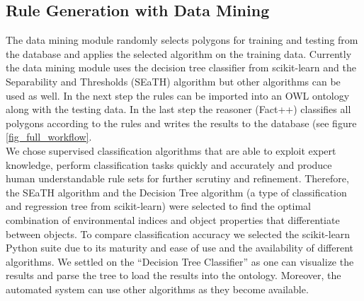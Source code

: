 \documentclass[authoryear, review,12pt,number]{elsarticle}
\begin{document}

\subsection{Rule Generation with Data Mining} The data mining module randomly
selects polygons for training and testing from the database and applies the
selected algorithm on the training data. 
Currently the data mining module uses the decision tree classifier from
scikit-learn \citep{scikit-learn} and the Separability and Thresholds (SEaTH)
algorithm \citep{Nussbaum2006} but other algorithms can be used as well. In the
next step the rules can be imported into an OWL ontology along with the testing
data. In the last step the reasoner (Fact++) classifies all polygons according
to the rules and writes the results to the database (see figure
\ref{fig_full_workflow}.\\ We chose supervised classification algorithms that
are able to exploit expert knowledge, perform classification tasks quickly and
accurately and produce human understandable rule sets for further scrutiny and
refinement. Therefore, the SEaTH algorithm and the Decision Tree algorithm (a
type of classification and regression tree from scikit-learn) were selected to
find the optimal combination of environmental indices and object properties
that differentiate between objects.  To compare classification accuracy we
selected the scikit-learn Python suite \citep{scikit-learn} due to its maturity
and ease of use and the availability of different algorithms. We settled on the
``Decision Tree Classifier'' as one can visualize the results and parse the
tree to load the results into the ontology.  Moreover, the automated system can
use other algorithms as they become available.\\
\end{document}
